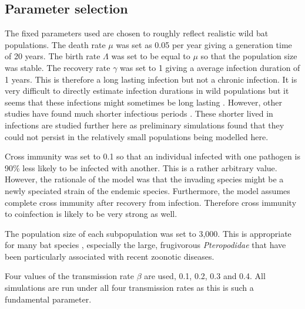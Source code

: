 \subsection{Parameter selection}


The fixed parameters used are chosen to roughly reflect realistic wild bat populations. 
The death rate $\mu$ was set as 0.05 per year giving a generation time of 20 years.
The birth rate $\Lambda$ was set to be equal to $\mu$ so that the population size was stable.
The recovery rate $\gamma$ was set to 1 giving a average infection duration of 1 years. 
This is therefore a long lasting infection but not a chronic infection. 
It is very difficult to directly estimate infection durations in wild populations but it seems that these infections might sometimes be long lasting \cite{peel2012henipavirus, plowright2015ecological}.
However, other studies have found much shorter infectious periods \cite{amengual2007temporal}.
These shorter lived in infections are studied further here as preliminary simulations found that they could not persist in the relatively small populations being modelled here.

Cross immunity was set to 0.1 so that an individual infected with one pathogen is 90\% less likely to be infected with another.
This is a rather arbitrary value.
However, the rationale of the model was that the invading species might be a newly speciated strain of the endemic species.
Furthermore, the model assumes complete cross immunity after recovery from infection.
Therefore cross immunity to coinfection is likely to be very strong as well.

The population size of each subpopulation was set to 3,000. 
This is appropriate for many bat species \cite{jones2009pantheria}, especially the large, frugivorous \emph{Pteropodidae} that have been particularly associated with recent zoonotic diseases.


Four values of the transmission rate $\beta$ are used, 0.1, 0.2, 0.3 and 0.4.
All simulations are run under all four transmission rates as this is such a fundamental parameter.

